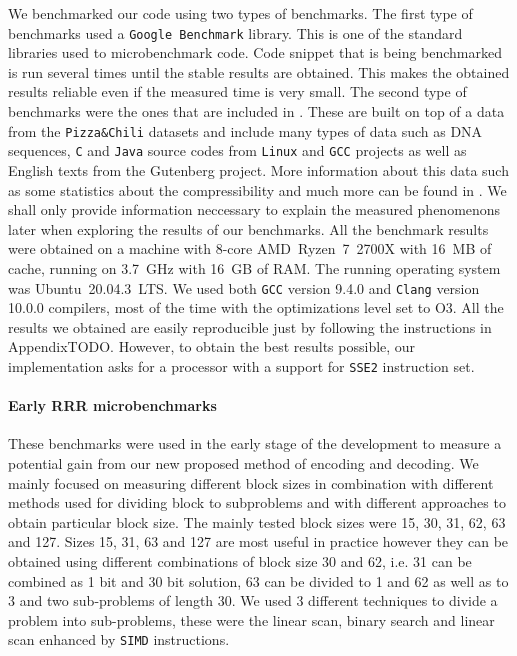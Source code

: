 We benchmarked our code using two types of benchmarks. The first type of benchmarks used
a \texttt{Google Benchmark} library. This is one of the standard libraries used to
microbenchmark code. Code snippet that is being benchmarked is run several times until
the stable results are obtained. This makes the obtained results reliable even if the
measured time is very small. The second type of benchmarks
were the ones that are included in \sdsl. These are built on top of a data from the
\texttt{Pizza\&Chili} datasets \citep{ferragina2005pizza} and include many types of data such
as DNA sequences, \texttt{C} and \texttt{Java} source codes from \texttt{Linux} and \texttt{GCC}
projects as well as English texts from the Gutenberg project. More information about this
data such as some statistics about the compressibility and much more can be found in
\cite{ferragina2009compressed}. We shall only provide information neccessary to explain the
measured phenomenons later when exploring the results of our benchmarks. All the benchmark
results were obtained on a machine with 8-core AMD~Ryzen~7~2700X with 16~MB of cache, running
on 3.7~GHz with 16~GB of RAM. The running operating system was Ubuntu~20.04.3~LTS.
We used both \texttt{GCC} version 9.4.0 and \texttt{Clang} version 10.0.0 compilers,
most of the time with the optimizations level set to O3. All the results we obtained are
easily reproducible just by following the instructions in AppendixTODO. However, to obtain
the best results possible, our implementation asks for a processor with a support for \texttt{SSE2}
instruction set.

\paragraph{Early RRR microbenchmarks}

These benchmarks were used in the early stage of the development to measure a potential gain from
our new proposed method of encoding and decoding. We mainly focused on measuring different block sizes
in combination with different methods used for dividing block to subproblems and with different
approaches to obtain particular block size. The mainly tested block sizes were 15, 30, 31, 62, 63
and 127. Sizes 15, 31, 63 and 127 are most useful in practice however they can be obtained using
different combinations of block size 30 and 62, i.e. 31 can be combined as 1 bit and 30 bit solution,
63 can be divided to 1 and 62 as well as to 3 and two sub-problems of length 30.
We used 3 different techniques to divide a problem into sub-problems, these were the linear scan,
binary search and linear scan enhanced by \texttt{SIMD} instructions.

